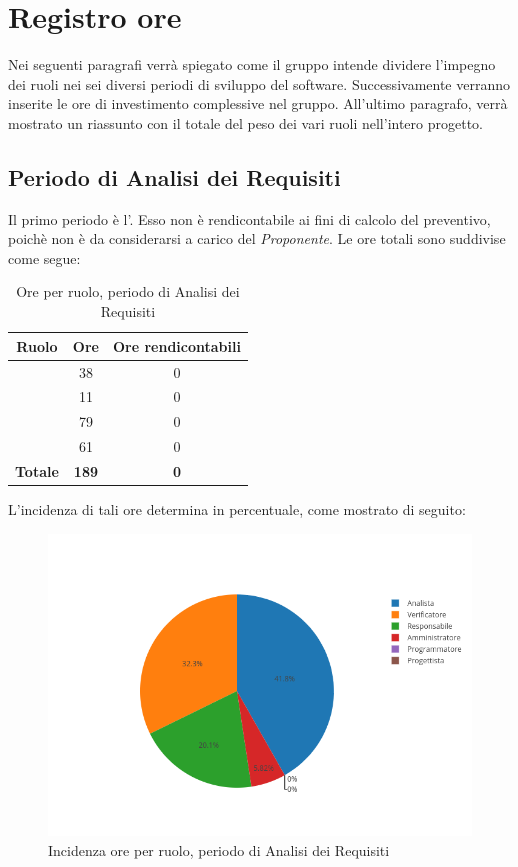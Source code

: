 \newpage
\section{Registro ore}
Nei seguenti paragrafi verrà spiegato come il gruppo intende dividere l'impegno dei ruoli nei sei diversi periodi di sviluppo del software. Successivamente verranno inserite le ore di investimento complessive nel gruppo. 
All'ultimo paragrafo, verrà mostrato un riassunto con il totale del peso dei vari ruoli nell'intero progetto.

\subsection{Periodo di Analisi dei Requisiti}
Il primo periodo è l'\AdR. Esso non è rendicontabile ai fini di calcolo del preventivo, poichè non è da considerarsi a carico del \textit{Proponente}. Le ore totali sono suddivise come segue:

\begin{table}[H]
	\begin{center}
		\begin{tabular}{|c|c|c|}
			\hline
			\textbf{Ruolo}	& \textbf{Ore}	& \textbf{Ore rendicontabili} \\
			\hline
			\Res	&	38	&  0 \\
			\hline
			\Amm	&	11	&  0 \\
			\hline
			\Ana	&	79	&  0 \\
			\hline
			\Ver	&	61	&  0 \\
			\hline
			\textbf{Totale} & \textbf{189} & \textbf{0} \\
			\hline
		\end{tabular}
	\end{center}
	\caption{Ore per ruolo, periodo di Analisi dei Requisiti}
\end{table}

L'incidenza di tali ore determina in percentuale, come mostrato di seguito:
\begin{figure}[H]
	\centering
	\includegraphics[scale=0.6]{img/AnalisiRequisiti.png}
	\caption{Incidenza ore per ruolo, periodo di Analisi dei Requisiti}
\end{figure}

